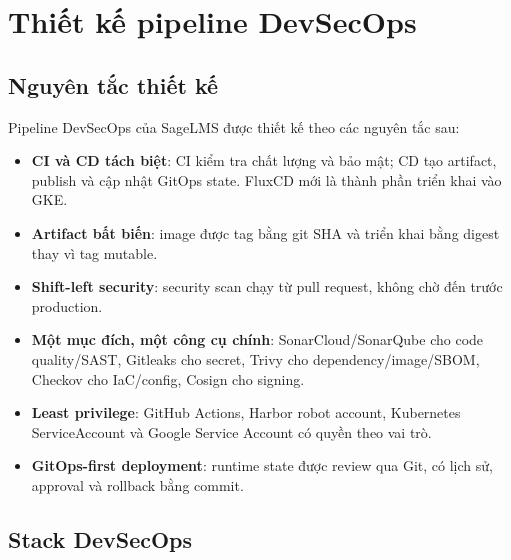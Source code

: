 \chapter{Thiết kế pipeline DevSecOps}
\label{chap:pipeline-design}

\section{Nguyên tắc thiết kế}

Pipeline DevSecOps của SageLMS được thiết kế theo các nguyên tắc sau:

\begin{itemize}
  \item \textbf{CI và CD tách biệt}: CI kiểm tra chất lượng và bảo mật; CD tạo artifact, publish và cập nhật GitOps state. FluxCD mới là thành phần triển khai vào GKE.
  \item \textbf{Artifact bất biến}: image được tag bằng git SHA và triển khai bằng digest thay vì tag mutable.
  \item \textbf{Shift-left security}: security scan chạy từ pull request, không chờ đến trước production.
  \item \textbf{Một mục đích, một công cụ chính}: SonarCloud/SonarQube cho code quality/SAST, Gitleaks cho secret, Trivy cho dependency/image/SBOM, Checkov cho IaC/config, Cosign cho signing.
  \item \textbf{Least privilege}: GitHub Actions, Harbor robot account, Kubernetes ServiceAccount và Google Service Account có quyền theo vai trò.
  \item \textbf{GitOps-first deployment}: runtime state được review qua Git, có lịch sử, approval và rollback bằng commit.
\end{itemize}

\section{Stack DevSecOps}

